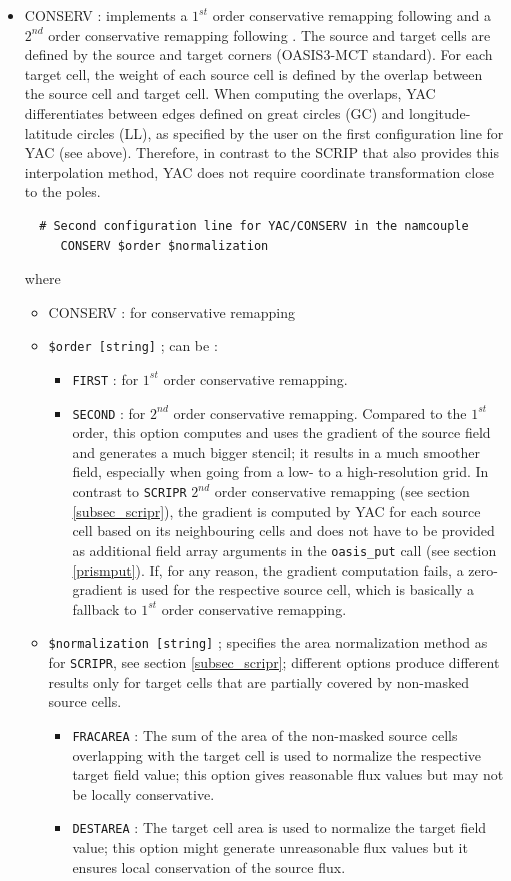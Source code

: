 \begin{itemize}
\item CONSERV : implements a $1^{st}$ order conservative remapping following \cite{Jones99} and a $2^{nd}$ order conservative remapping following \cite{kritsikis2017} . The source and target cells are defined by the source and target corners (OASIS3-MCT standard). 
For each target cell, 
the weight of each source cell is defined by the overlap between the source cell and target
cell. When computing the overlaps, YAC differentiates
between edges defined on great circles (GC) and longitude-latitude circles (LL), as specified by the user 
on the first configuration line for YAC (see above). Therefore, in contrast to the SCRIP that also provides this
interpolation method, YAC does not require coordinate transformation close to the
poles.
\begin{verbatim}
  # Second configuration line for YAC/CONSERV in the namcouple
     CONSERV $order $normalization 
\end{verbatim}
where
\begin{itemize}
\item CONSERV : for conservative remapping
\item {\tt \$order [string]} ; can be :
\begin{itemize}
  \item {\tt FIRST} : for $1^{st}$ order conservative remapping.
  \item {\tt SECOND} : for $2^{nd}$ order conservative remapping. Compared to the $1^{st}$ order, this option computes and uses the gradient of the source field and generates a much bigger stencil; it results in a much smoother field, especially when going from a low- to a high-resolution grid. In contrast to  {\tt SCRIPR} $2^{nd}$ order conservative remapping (see section \ref{subsec_scripr}), the gradient is computed  by YAC for each source cell based on its
neighbouring cells and does not have to be provided as additional field array arguments in the {\tt oasis\_put} call (see section \ref{prismput}).  If, for any reason, the gradient computation fails, a zero-gradient is used for the respective source cell, which is basically a fallback to $1^{st}$ order conservative remapping.
\end{itemize}
\item {\tt \$normalization [string]} ; specifies the area normalization method as for {\tt SCRIPR}, see section \ref{subsec_scripr}; different options produce different results only for target cells that are partially covered by non-masked source cells.
\begin{itemize}
\item {\tt FRACAREA} : The sum of the area of the non-masked source cells overlapping with the target cell is
used to normalize the respective target field value; this option gives reasonable flux values but may not be locally conservative.
\item {\tt DESTAREA} : The target cell area is used to normalize the target field value; this option might generate unreasonable flux values but it ensures local conservation of the source flux.
\end{itemize}
\end{itemize}


\end{itemize}
